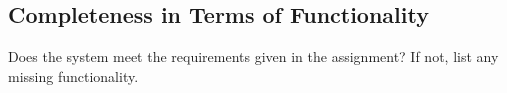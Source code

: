 \subsection{Completeness in Terms of Functionality} 

Does the system meet the requirements given in the assignment? If not, list any missing functionality.


